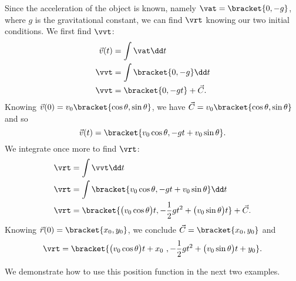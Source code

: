 Since the acceleration of the object is known, namely $\vat =\bracket{0,-g}$, where $g$ is the gravitational constant, we can find $\vrt$ knowing our two initial conditions. We first find $\vvt$:
\begin{align*}
\vec v(t) &= \int \vat \dd t\\
\vvt &= \int\bracket{0,-g}\dd t\\
\vvt &=\bracket{0,-gt}+ \vec C.
\end{align*}
Knowing $\vec v(0) = v_0\bracket{\cos \theta,\sin \theta}$, we have $\vec C = v_0\bracket{\cos\theta,\sin\theta}$ and so
\[\vec v(t) =\bracket{v_0\cos \theta, -gt+v_0\sin\theta}.\]
We integrate once more to find $\vrt$:
\begin{align*}
\vrt &= \int \vvt\dd t \\
\vrt &= \int\bracket{v_0\cos \theta, -gt+v_0\sin\theta}\dd t\\
\vrt &=\bracket{\bigl(v_0\cos \theta\bigr)t, -\frac12gt^2+\bigl(v_0\sin\theta\bigr)t}+ \vec C.
\end{align*}
Knowing $\vec r(0) =\bracket{x_0,y_0}$, we conclude $\vec C =\bracket{x_0,y_0}$ and
\begin{equation}
\vrt
=\bracket{\bigl(v_0\cos\theta\bigr)t+x_0\ ,-\frac12gt^2+\bigl(v_0\sin\theta\bigr)t+y_0}.
\label{idea:projectile}
\end{equation}


We demonstrate how to use this position function in the next two examples.

